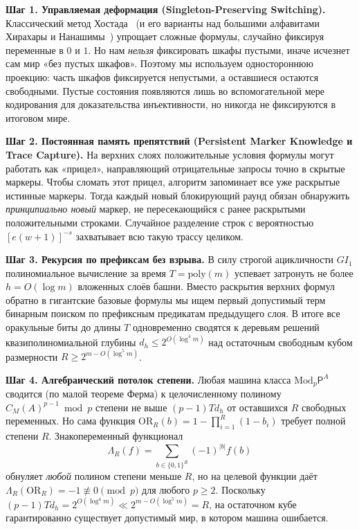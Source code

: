 \documentclass[11pt,a4paper]{article}
\newcommand{\Modp}{\mathrm{Mod}_p\mathsf{P}}
\newcommand{\OR}{\mathrm{OR}}
\newcommand{\GI}{GI_1}
\begin{document}
\textbf{Шаг 1. Управляемая деформация (Singleton-Preserving Switching).} Классический метод Хостада~\cite{Hastad1986} (и его варианты над большими алфавитами Хирахары и Нанашимы~\cite{HiraharaNanashima2021}) упрощает сложные формулы, случайно фиксируя переменные в $0$ и $1$. Но нам \emph{нельзя} фиксировать шкафы пустыми, иначе исчезнет сам мир «без пустых шкафов». Поэтому мы используем одностороннюю проекцию: часть шкафов фиксируется непустыми, а оставшиеся остаются свободными. Пустые состояния появляются лишь во вспомогательной мере кодирования для доказательства инъективности, но никогда не фиксируются в итоговом мире.

\textbf{Шаг 2. Постоянная память препятствий (Persistent Marker Knowledge и Trace Capture).} На верхних слоях положительные условия формулы могут работать как «прицел», направляющий отрицательные запросы точно в скрытые маркеры. Чтобы сломать этот прицел, алгоритм запоминает все уже раскрытые истинные маркеры. Тогда каждый новый блокирующий раунд обязан обнаружить \emph{принципиально новый} маркер, не пересекающийся с ранее раскрытыми положительными строками. Случайное разделение строк с вероятностью $[e(w+1)]^{-s}$ захватывает всю такую трассу целиком.

\textbf{Шаг 3. Рекурсия по префиксам без взрыва.} В силу строгой ацикличности $\GI$ полиномиальное вычисление за время $T = \mathrm{poly}(m)$ успевает затронуть не более $h = O(\log m)$ вложенных слоёв башни. Вместо раскрытия верхних формул обратно в гигантские базовые формулы мы ищем первый допустимый терм бинарным поиском по префиксным предикатам предыдущего слоя. В итоге все оракульные биты до длины $T$ одновременно сводятся к деревьям решений квазиполиномиальной глубины $d_h \le 2^{O(\log^4 m)}$ над остаточным свободным кубом размерности $R \ge 2^{m - O(\log^5 m)}$.

\textbf{Шаг 4. Алгебраический потолок степени.} Любая машина класса $\Modp^A$ сводится (по малой теореме Ферма) к целочисленному полиному $C_M(A)^{p-1} \bmod p$ степени не выше $(p-1)Td_h$ от оставшихся $R$ свободных переменных. Но сама функция $\OR_R(b) = 1 - \prod_{i=1}^R (1 - b_i)$ требует полной степени $R$. Знакопеременный функционал
\[
  \Lambda_R(f) = \sum_{b \in \{0,1\}^R} (-1)^{|b|} f(b)
\]
обнуляет \emph{любой} полином степени меньше $R$, но на целевой функции даёт $\Lambda_R(\OR_R) = -1 \not\equiv 0 \pmod p$ для любого $p \ge 2$. Поскольку $(p-1)Td_h = 2^{O(\log^4 m)} \ll 2^{m - O(\log^5 m)} = R$, на остаточном кубе гарантированно существует допустимый мир, в котором машина ошибается.
\end{document}
